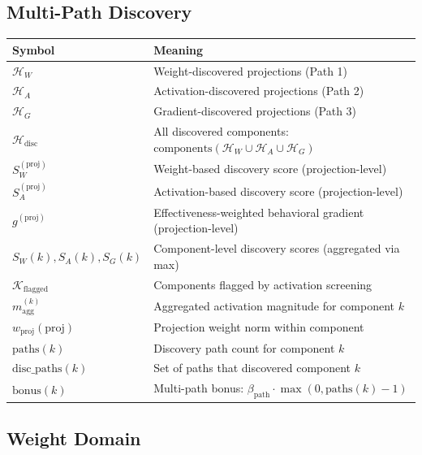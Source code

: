 \documentclass[11pt]{article}
\begin{document}
\subsection{Multi-Path Discovery}
\label{app:notation-multi-path-discovery}

\begin{center}
\begin{tabular}{ll}
\toprule
\textbf{Symbol} & \textbf{Meaning} \\
\midrule
$\mathcal{H}_W$ & Weight-discovered projections (Path 1) \\
$\mathcal{H}_A$ & Activation-discovered projections (Path 2) \\
$\mathcal{H}_G$ & Gradient-discovered projections (Path 3) \\
$\mathcal{H}_{\text{disc}}$ & All discovered components: $\text{components}(\mathcal{H}_W \cup \mathcal{H}_A \cup \mathcal{H}_G)$ \\
$S^{(\text{proj})}_W$ & Weight-based discovery score (projection-level) \\
$S^{(\text{proj})}_A$ & Activation-based discovery score (projection-level) \\
$g^{(\text{proj})}$ & Effectiveness-weighted behavioral gradient (projection-level) \\
$S_W(k), S_A(k), S_G(k)$ & Component-level discovery scores (aggregated via max) \\
$\mathcal{K}_{\text{flagged}}$ & Components flagged by activation screening \\
$m^{(k)}_{\text{agg}}$ & Aggregated activation magnitude for component $k$ \\
$w_{\text{proj}}(\text{proj})$ & Projection weight norm within component \\
$\text{paths}(k)$ & Discovery path count for component $k$ \\
$\text{disc\_paths}(k)$ & Set of paths that discovered component $k$ \\
$\text{bonus}(k)$ & Multi-path bonus: $\beta_{\text{path}} \cdot \max(0, \text{paths}(k) - 1)$ \\
\bottomrule
\end{tabular}
\end{center}

\subsection{Weight Domain}
\label{app:notation-weight-domain}
\end{document}
